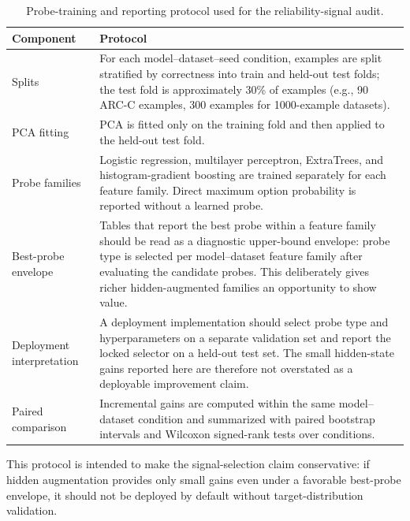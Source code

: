 
\begin{table}[t]
\centering
\small
\caption{Probe-training and reporting protocol used for the reliability-signal audit.}
\label{tab:probe-protocol}
\begin{threeparttable}
\begin{tabularx}{\textwidth}{p{}X}
\toprule
Component & Protocol \\
\midrule
Splits & For each model--dataset--seed condition, examples are split stratified by correctness into train and held-out test folds; the test fold is approximately 30\% of examples (e.g., 90 ARC-C examples, 300 examples for 1000-example datasets). \\
PCA fitting & PCA is fitted only on the training fold and then applied to the held-out test fold. \\
Probe families & Logistic regression, multilayer perceptron, ExtraTrees, and histogram-gradient boosting are trained separately for each feature family. Direct maximum option probability is reported without a learned probe. \\
Best-probe envelope & Tables that report the best probe within a feature family should be read as a diagnostic upper-bound envelope: probe type is selected per model--dataset feature family after evaluating the candidate probes. This deliberately gives richer hidden-augmented families an opportunity to show value. \\
Deployment interpretation & A deployment implementation should select probe type and hyperparameters on a separate validation set and report the locked selector on a held-out test set. The small hidden-state gains reported here are therefore not overstated as a deployable improvement claim. \\
Paired comparison & Incremental gains are computed within the same model--dataset condition and summarized with paired bootstrap intervals and Wilcoxon signed-rank tests over conditions. \\
\bottomrule
\end{tabularx}
\begin{tablenotes}[flushleft]\footnotesize\item This protocol is intended to make the signal-selection claim conservative: if hidden augmentation provides only small gains even under a favorable best-probe envelope, it should not be deployed by default without target-distribution validation.\end{tablenotes}
\end{threeparttable}
\end{table}
